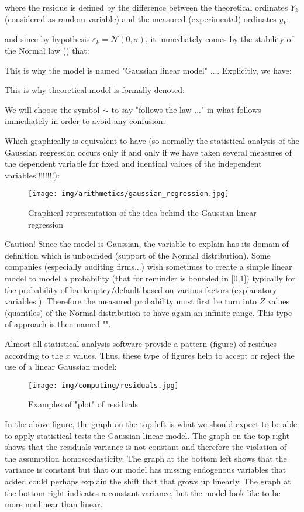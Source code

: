 	where  the residue is defined by the difference between the theoretical ordinates $Y_k$ (considered as random variable) and the measured (experimental) ordinates $y_k$:
	
	and since by hypothesis $\varepsilon_k=\mathcal{N}(0,\sigma)$, it immediately comes by the stability of the Normal law () that:
	
	This is why the model is named "Gaussian linear model" .... Explicitly, we have:
	
	This is why theoretical model is formally denoted: 
	
	
	We will choose the symbol $\sim$ to say "follows the law ..." in what follows immediately in order to avoid any confusion:
	
	Which graphically is equivalent to have (so normally the statistical analysis of the Gaussian regression occurs only if and only if we have taken several measures of the dependent variable for fixed and identical values of the independent variables!!!!!!!!):
	\begin{figure}[H]
		\centering
		\texttt{[image: img/arithmetics/gaussian\_regression.jpg]}
		\caption{Graphical representation of the idea behind the Gaussian linear regression}
	\end{figure}
	Caution! Since the model is Gaussian, the variable to explain has its domain of definition which is unbounded (support of the Normal distribution). Some companies (especially auditing firms...) wish sometimes to create a simple linear model to model a  probability (that for reminder is bounded in [0,1]) typically for the probability of bankruptcy/default based on various factors (explanatory variables ). Therefore the measured probability must first be turn into $Z$ values (quantiles) of the Normal distribution to have again an infinite range. This type of approach is then named "".

	Almost all statistical analysis software provide a pattern (figure) of residues according to the $x$ values. Thus, these type of figures help to accept or reject the use of a linear Gaussian model:

	\begin{figure}[H]
		\centering
		\texttt{[image: img/computing/residuals.jpg]}
		\caption{Examples of "plot" of residuals}
	\end{figure}

	In the above figure, the graph on the top left is what we should expect to be able to apply statistical tests the Gaussian linear model. The graph on the top right shows that the residuals variance is not constant and therefore the violation of the assumption homoscedasticity. The graph at the bottom left shows that the variance is constant but that our model has missing endogenous variables that added could perhaps explain the shift that that grows up linearly. The graph at the bottom right indicates a constant variance, but the model look like to be more nonlinear than linear.

